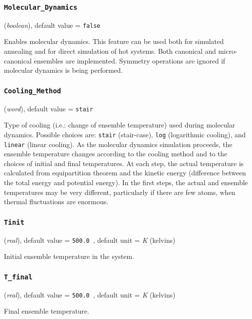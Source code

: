 \documentclass{article}
\begin{document}
\subsubsection{\tt Molecular\_Dynamics 
\label{MolecularDynamics}}
({\it boolean}),
default value = {\tt false }

Enables molecular dynamics. This feature can be used both for
simulated annealing and for direct simulation of hot systems. Both
canonical and micro-canonical ensembles are implemented. Symmetry
operations are ignored if molecular dynamics is being performed.

\subsubsection{\tt Cooling\_Method 
\label{CoolingMethod}}
({\it word}),
default value = {\tt stair }

Type of cooling (i.e.: change of ensemble temperature) used during molecular
dynamics. Possible choices are: {\tt stair} (stair-case), {\tt log}
(logarithmic cooling), and {\tt linear} (linear cooling). As the
molecular dynamics simulation proceeds, the
ensemble temperature changes according to the cooling method and to the
choices of initial and final temperatures. At each step, the actual temperature
is calculated from equipartition theorem and the kinetic energy (difference
between the total energy and potential energy). In the first steps, the
actual and ensemble temperatures may be very different, particularly if there
are few atoms, when thermal fluctuations are enormous.

\subsubsection{\tt Tinit 
\label{Tinit}}
({\it real}),
default value = {\tt 500.0 },
default unit = {\it K} (kelvins)

Initial ensemble temperature in the system.

\subsubsection{\tt T\_final 
\label{Tfinal}}
({\it real}),
default value = {\tt 500.0 },
default unit = {\it K} (kelvins)

Final ensemble temperature.
\end{document}
